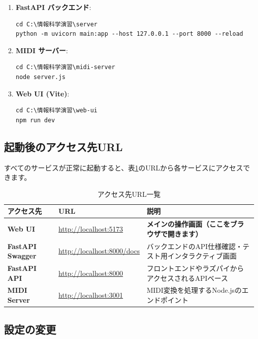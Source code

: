 \begin{enumerate}
  \item \textbf{FastAPI バックエンド}:
    \begin{lstlisting}[style=powershell]
cd C:\情報科学演習\server
python -m uvicorn main:app --host 127.0.0.1 --port 8000 --reload
    \end{lstlisting}
  \item \textbf{MIDI サーバー}:
    \begin{lstlisting}[style=powershell]
cd C:\情報科学演習\midi-server
node server.js
    \end{lstlisting}
  \item \textbf{Web UI (Vite)}:
    \begin{lstlisting}[style=powershell]
cd C:\情報科学演習\web-ui
npm run dev
    \end{lstlisting}
\end{enumerate}

\subsection{起動後のアクセス先URL}

すべてのサービスが正常に起動すると、表\ref{tab:endpoints}のURLから各サービスにアクセスできます。

\begin{table}[htbp]
  \centering
  \caption{アクセス先URL一覧}
  \label{tab:endpoints}
  \begin{tabularx}{\textwidth}{l l X}
    \toprule
    \textbf{アクセス先} & \textbf{URL} & \textbf{説明} \\
    \midrule
    \textbf{Web UI} & \url{http://localhost:5173} & \textbf{メインの操作画面（ここをブラウザで開きます）} \\
    \textbf{FastAPI Swagger} & \url{http://localhost:8000/docs} & バックエンドのAPI仕様確認・テスト用インタラクティブ画面 \\
    \textbf{FastAPI API} & \url{http://localhost:8000} & フロントエンドやラズパイからアクセスされるAPIベース \\
    \textbf{MIDI Server} & \url{http://localhost:3001} & MIDI変換を処理するNode.jsのエンドポイント \\
    \bottomrule
  \end{tabularx}
\end{table}

\subsection{設定の変更}

